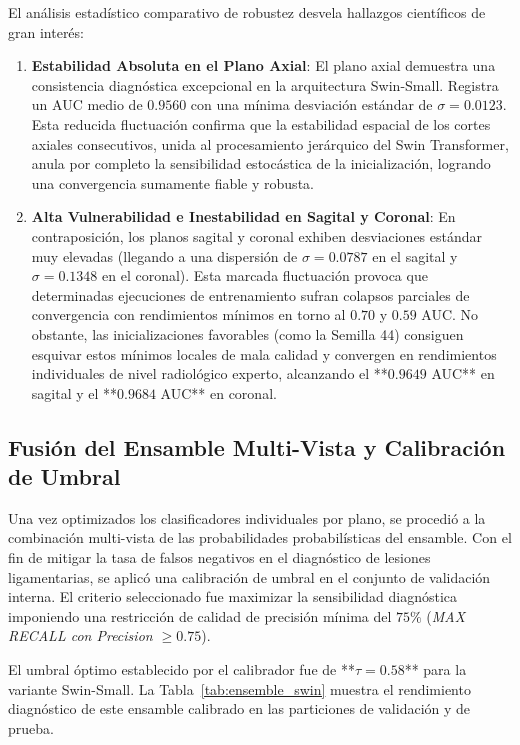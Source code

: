 El análisis estadístico comparativo de robustez desvela hallazgos científicos de gran interés:
\begin{enumerate}
    \item \textbf{Estabilidad Absoluta en el Plano Axial}: El plano axial demuestra una consistencia diagnóstica excepcional en la arquitectura Swin-Small. Registra un AUC medio de $0.9560$ con una mínima desviación estándar de $\sigma = 0.0123$. Esta reducida fluctuación confirma que la estabilidad espacial de los cortes axiales consecutivos, unida al procesamiento jerárquico del Swin Transformer, anula por completo la sensibilidad estocástica de la inicialización, logrando una convergencia sumamente fiable y robusta.
    \item \textbf{Alta Vulnerabilidad e Inestabilidad en Sagital y Coronal}: En contraposición, los planos sagital y coronal exhiben desviaciones estándar muy elevadas (llegando a una dispersión de $\sigma = 0.0787$ en el sagital y $\sigma = 0.1348$ en el coronal). Esta marcada fluctuación provoca que determinadas ejecuciones de entrenamiento sufran colapsos parciales de convergencia con rendimientos mínimos en torno al $0.70$ y $0.59$ AUC. No obstante, las inicializaciones favorables (como la Semilla 44) consiguen esquivar estos mínimos locales de mala calidad y convergen en rendimientos individuales de nivel radiológico experto, alcanzando el **$0.9649$ AUC** en sagital y el **$0.9684$ AUC** en coronal.
\end{enumerate}

\subsection{Fusión del Ensamble Multi-Vista y Calibración de Umbral}
Una vez optimizados los clasificadores individuales por plano, se procedió a la combinación multi-vista de las probabilidades probabilísticas del ensamble. Con el fin de mitigar la tasa de falsos negativos en el diagnóstico de lesiones ligamentarias, se aplicó una calibración de umbral en el conjunto de validación interna. El criterio seleccionado fue maximizar la sensibilidad diagnóstica imponiendo una restricción de calidad de precisión mínima del $75\%$ (\textit{MAX RECALL con Precision $\ge 0.75$}). 

El umbral óptimo establecido por el calibrador fue de **$\tau = 0.58$** para la variante Swin-Small. La Tabla~\ref{tab:ensemble_swin} muestra el rendimiento diagnóstico de este ensamble calibrado en las particiones de validación y de prueba.

